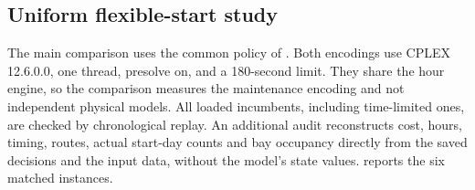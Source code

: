 \subsection{Uniform flexible-start study}
\label{subsec:uniform_results}
The main comparison uses the common policy of .
Both encodings use CPLEX 12.6.0.0, one thread, presolve on, and a 180-second limit.
They share the hour engine, so the comparison measures the maintenance encoding and not independent physical models.
All loaded incumbents, including time-limited ones, are checked by chronological replay.
An additional audit reconstructs cost, hours, timing, routes, actual start-day counts and bay occupancy
directly from the saved decisions and the input data, without the model's state values.
 reports the six matched instances.
\begin{table}[t]\centering\scriptsize
\caption{Uniform flexible-start encodings. Wall time is measured around the solver call.
``Limit'' means the 180-second limit was reached with an incumbent; such an incumbent is not a proven optimum.}
\label{tab:uniform_flexible}\end{table}
